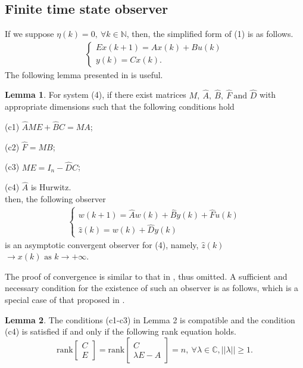 \documentclass[english]{cccconf}
\theoremstyle{definition}
\newtheorem{lemma}{Lemma}
\begin{document}
\subsection{Finite time state observer}
If we suppose $\eta(k)=0,\ \forall k\in\mathbb{N}$, then, the simplified form of (1) is as follows.
\begin{equation}\begin{split}\begin{cases}
Ex(k+1)=Ax(k)+Bu(k)\\
y(k)=Cx(k).
\end{cases}\end{split}\end{equation}
The following lemma presented in \cite{5573041} is useful.
\begin{lemma} For system (4), if there exist matrices $M,\ \hat{A},\ \hat{B},\ \hat{F}\ \text{and }\hat{D}$ with appropriate dimensions such that the following conditions hold

(c1) $\hat{A}ME+\hat{B}C=MA$;

(c2) $\hat{F}=MB$;

(c3) $ME=I_n-\hat{D}C$;

(c4) $\hat{A}$ is Hurwitz.\\
then, the following observer
\begin{equation}\begin{split}\begin{cases}
w(k+1)=\hat{A}w(k)+\hat{B}y(k)+\hat{F}u(k)\\
\hat{z}(k)=w(k)+\hat{D}y(k)
\end{cases}\end{split}\end{equation}
is an asymptotic convergent observer for (4), namely, $\hat{z}(k)$$\rightarrow x(k) \text{ as } k\rightarrow +\infty$.
\end{lemma}
The proof of convergence is similar to that in \citep{5573041}, thus omitted. A sufficient and necessary condition for the existence of such an observer is as follows, which is a special case of that proposed in \citep{5573041}.
\begin{lemma} The conditions (c1-c3) in Lemma 2 is compatible and the condition (c4) is satisfied if and only if the following rank equation holds.
\begin{equation}
\textrm{rank}\begin{bmatrix}
C\\E
\end{bmatrix}=\textrm{rank}\begin{bmatrix}
C\\\lambda E-A
\end{bmatrix}=n,\ \forall\lambda\in\mathbb{C},||\lambda||\geq 1.
\end{equation}
\end{lemma}
\end{document}
